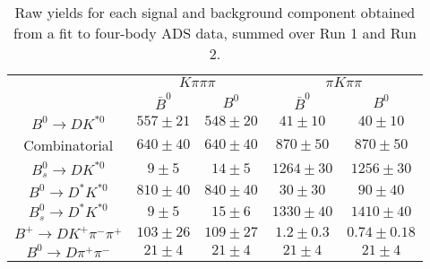 \begin{table}
  \centering
  \begin{tabular}{ccccc}
      \toprule
       & \multicolumn{2}{c}{$K\pi\pi\pi$} & \multicolumn{2}{c}{$\pi K\pi\pi$} \\
      & $\bar{B}^0$ & $B^0$& $\bar{B}^0$ & $B^0$ \\
      \midrule
      $B^0 \to DK^{*0}$ & $557 \pm 21$ & $548 \pm 20$ & $41 \pm 10$ & $40 \pm 10$ \\
      Combinatorial & $640 \pm 40$ & $640 \pm 40$ & $870 \pm 50$ & $870 \pm 50$ \\
      $B^0_s \to DK^{*0}$ & $9 \pm 5$ & $14 \pm 5$ & $1264 \pm 30$ & $1256 \pm 30$ \\
      $B^0 \to D^*K^{*0}$ & $810 \pm 40$ & $840 \pm 40$ & $30 \pm 30$ & $90 \pm 40$ \\
      $B^0_s \to D^*K^{*0}$ & $9 \pm 5$ & $15 \pm 6$ & $1330 \pm 40$ & $1410 \pm 40$ \\
      $B^+ \to DK^+\pi^-\pi^+$ & $103 \pm 26$ & $109 \pm 27$ & $1.2 \pm 0.3$ & $0.74 \pm 0.18$ \\
      $B^0 \to D\pi^+\pi^-$ & $21 \pm 4$ & $21 \pm 4$ & $21 \pm 4$ & $21 \pm 4$ \\
      \bottomrule
      \end{tabular}
\caption{Raw yields for each signal and background component obtained from a fit to four-body ADS data, summed over Run 1 and Run 2.}
\label{tab:yields_split_4body_ADS}
\end{table}

